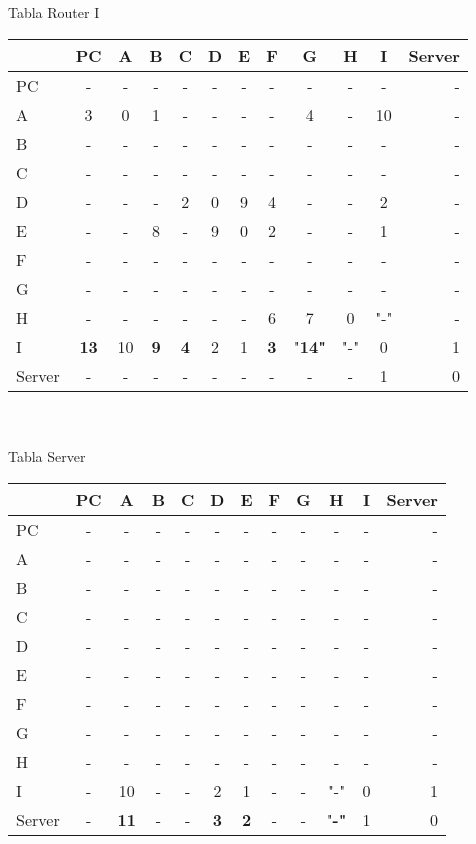\documentclass{article}
\begin{document}
\\
\\
Tabla Router I \\
\begin{tabular}{l*{10}{c}r}
              & PC & A & B & C & D & E & F & G & H & I & Server \\
\hline
PC             & - & - & - & - & - & - & - & - & - & - & -\\
A              & 3 & 0 & 1 & - & - & - & - & 4 & - & 10 & -\\
B              & - & - & - & - & - & - & - & - & - & - & -\\
C              & - & - & - & - & - & - & - & - & - & - & -\\
D              & - & - & - & 2 & 0 & 9 & 4 & - & - & 2 & -\\
E              & - & - & 8 & - & 9 & 0 & 2 & - & - & 1 & -\\
F              & - & - & - & - & - & - & - & - & - & - & -\\
G              & - & - & - & - & - & - & - & - & - & - & -\\
H              & - & - & - & - & - & - & 6 & 7 & 0 & "-" & -\\
I              &\bf{13}& 10 &\bf{9}&\bf{4}& 2 & 1 &\bf{3}&"\bf{14}"& "-" & 0 & 1\\
Server         & - & - & - & - & - & - & - & - & - & 1 & 0\\

\end{tabular}
\\
\\
Tabla Server \\
\begin{tabular}{l*{10}{c}r}
              & PC & A & B & C & D & E & F & G & H & I & Server \\
\hline
PC             & - & - & - & - & - & - & - & - & - & - & -\\
A              & - & - & - & - & - & - & - & - & - & - & -\\
B              & - & - & - & - & - & - & - & - & - & - & -\\
C              & - & - & - & - & - & - & - & - & - & - & -\\
D              & - & - & - & - & - & - & - & - & - & - & -\\
E              & - & - & - & - & - & - & - & - & - & - & -\\
F              & - & - & - & - & - & - & - & - & - & - & -\\
G              & - & - & - & - & - & - & - & - & - & - & -\\
H              & - & - & - & - & - & - & - & - & - & - & -\\
I              & - & 10 & - & - & 2 & 1 & - & - & "-" & 0 & 1\\
Server         & - &\bf{11}& - & - &\bf{3}&\bf{2}& - & - &"\bf{-}"& 1 & 0\\

\end{tabular}
\end{document}
